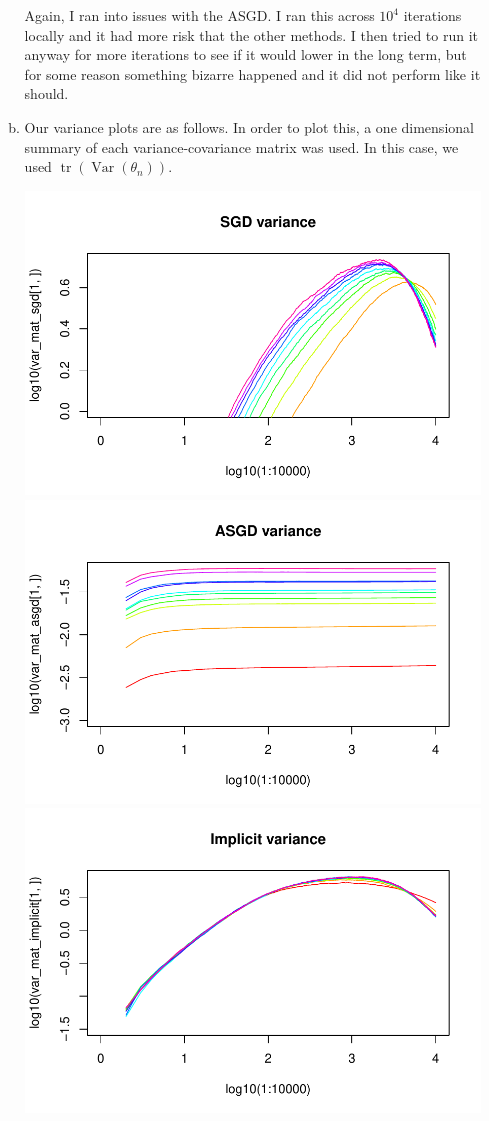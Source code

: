 \documentclass[letterpaper,10pt]{amsart}
\newcommand{\tr}{\operatorname{tr}}
\newcommand{\Var}{\operatorname{Var}}
\begin{document}
\begin{enumerate}[1.]
\begin{enumerate}[(a)]
Again, I ran into issues with the ASGD. I ran this across $10^4$ iterations locally and it had more risk that the other methods. I then tried to run it anyway for more iterations to see if it would lower in the long term, but for some reason something bizarre happened and it did not perform like it should.



\item
Our variance plots are as follows. In order to plot this, a one dimensional summary of each variance-covariance matrix was used. In this case, we used $\tr(\Var(\theta_n))$.
\begin{center}
\includegraphics[scale=0.4]{2cvar1.pdf}
\includegraphics[scale=0.4]{2cvar2.pdf}
\includegraphics[scale=0.4]{2cvar3.pdf}

\end{center}
\end{enumerate}
\end{enumerate}
\end{document}
